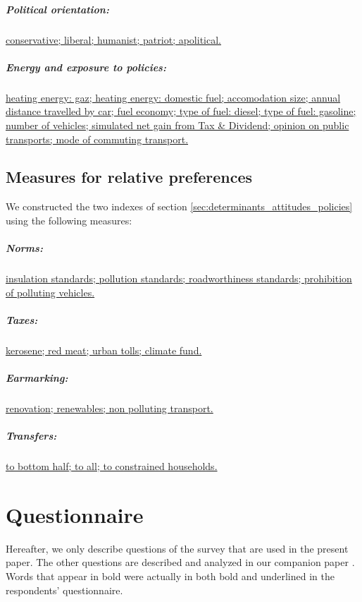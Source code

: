 \documentclass[english,5p,authoryear]{elsarticle}
\begin{document}
\begin{appendices}
\subparagraph{Political orientation:} \uline{conservative; liberal; humanist; patriot; apolitical.}

\subparagraph{Energy and exposure to policies:} \uline{heating energy: gaz; heating energy: domestic fuel; accomodation size; annual distance travelled by car; fuel economy; type of fuel: diesel; type of fuel: gasoline; number of vehicles; simulated net gain from Tax \& Dividend; opinion on public transports; mode of commuting transport.}

\subsection{Measures for relative preferences\label{app:measures}}

We constructed the two indexes of section \ref{sec:determinants_attitudes_policies} using the following measures:

\subparagraph{Norms:} \uline{insulation standards;  pollution standards; roadworthiness standards; prohibition of polluting vehicles.}

\subparagraph{Taxes:} \uline{kerosene; red meat; urban tolls; climate fund.}

\subparagraph{Earmarking:} \uline{renovation; renewables; non polluting transport.}

\subparagraph{Transfers:} \uline{to bottom half; to all; to constrained households.}

%
\section{Questionnaire\label{app:questionnaire}}

Hereafter, we only describe questions of the survey that are used
in the present paper. The other questions are described and analyzed
in our companion paper \citep{douenne_can_2019}. Words that appear in bold were actually in both bold and underlined in the respondents' questionnaire.


\end{appendices}
\end{document}
